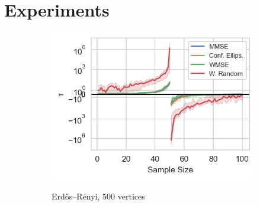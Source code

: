 \section{Experiments}
\label{sec:experiments}
\label{experiments_sec}



\iffalse
\begin{figure}
    \centering
    \begin{subfigure}{0.3\columnwidth}
    \resizebox{\width}{0.62\columnwidth}
    {\includegraphics[width=\columnwidth]{figures/proj1/plots/LS_threshold/ER_0pt8_500_bandwidth_50_thresholds_LS.png}}
    \caption{Erdős–Rényi, 500 vertices} 
    \label{snr_ER}
    \end{subfigure}
    \hfill
    \begin{subfigure}{0.3\columnwidth}

\end{subfigure}
\end{figure}

